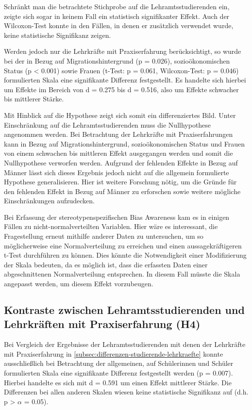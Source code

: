 Schränkt man die betrachtete Stichprobe auf die Lehramtsstudierenden ein, zeigte sich sogar in keinem Fall ein statistisch signifikanter Effekt.
Auch der Wilcoxon-Test konnte in den Fällen, in denen er zusätzlich verwendet wurde, keine statistische Signifikanz zeigen.

Werden jedoch nur die Lehrkräfte mit Praxiserfahrung berücksichtigt, so wurde bei der in Bezug auf Migrationshintergrund (p = 0.026), sozioökonomischen Status (p < 0.001) sowie Frauen (t-Test: p = 0.061, Wilcoxon-Test: p = 0.046) formulierten Skala eine signifikante Differenz festgestellt.
Es handelte sich hierbei um Effekte im Bereich von d = 0.275 bis d = 0.516, also um Effekte schwacher bis mittlerer Stärke.

Mit Hinblick auf die Hypothese zeigt sich somit ein differenziertes Bild.
Unter Einschränkung auf die Lehramtsstudierenden muss die Nullhypothese angenommen werden.
Bei Betrachtung der Lehrkräfte mit Praxiserfahrungen kann in Bezug auf Migrationshintergrund, sozioökonomischen Status und Frauen von einem schwachen bis mittleren Effekt ausgegangen werden und somit die Nullhypothese verworfen werden.
Aufgrund der fehlenden Effekte in Bezug auf Männer lässt sich dieses Ergebnis jedoch nicht auf die allgemein formulierte Hypothese generalisieren.
Hier ist weitere Forschung nötig, um die Gründe für den fehlenden Effekt in Bezug auf Männer zu erforschen sowie weitere mögliche Einschränkungen aufzudecken.

Bei Erfassung der stereotypenspezifischen Bias Awareness kam es in einigen Fällen zu nicht-normalverteilten Variablen.
Hier wäre es interessant, die Fragestellung erneut mithilfe anderer Daten zu untersuchen, um so möglicherweise eine Normalverteilung zu erreichen und einen aussagekräftigeren t-Test durchführen zu können.
Dies könnte die Notwendigkeit einer Modifizierung der Skala bedeuten, da es möglich ist, dass die erfassten Daten einer abgeschnittenen Normalverteilung entsprechen.
In diesem Fall müsste die Skala angepasst werden, um diesem Effekt vorzubeugen.

\subsection{Kontraste zwischen Lehramtsstudierenden und Lehrkräften mit Praxiserfahrung (H4)}
\label{subsec:diskussion-h4}

Bei Vergleich der Ergebnisse der Lehramtsstudierenden mit denen der Lehrkräfte mit Praxiserfahrung in \autoref{subsec:differenzen-studierende-lehrkraefte} konnte ausschließlich bei Betrachtung der allgemeinen, auf Schülerinnen und Schüler formulierten Skala eine signifikante Differenz festgestellt werden (p = 0.007).
Hierbei handelte es sich mit d = 0.591 um einen Effekt mittlerer Stärke.
Die Differenzen bei allen anderen Skalen wiesen keine statistische Signifikanz auf (d.h. p > $\alpha$ = 0.05).

